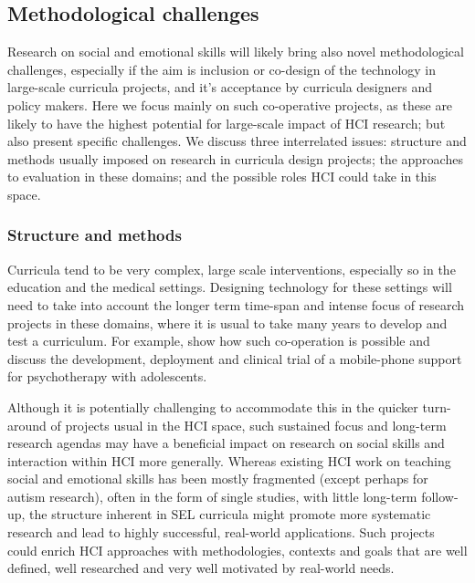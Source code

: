 \documentclass[prodmode,acmtochi]{acmsmall}
\begin{document}
\subsection{Methodological challenges}
Research on social and emotional skills will likely bring also novel methodological challenges, especially if the aim is inclusion or co-design of the technology in large-scale curricula projects, and it's acceptance by curricula designers and policy makers. Here we focus mainly on such co-operative projects, as these are likely to have the highest potential for large-scale impact of HCI research; but also present specific challenges. We discuss three interrelated issues: structure and methods usually imposed on research in curricula design projects; the approaches to evaluation in these domains; and the possible roles HCI could take in this space. 

\subsubsection{Structure and methods}
Curricula tend to be very complex, large scale interventions, especially so in the education and the medical settings. Designing technology for these settings will need to take into account the longer term time-span and intense focus of research projects in these domains, where it is usual to take many years to develop and test a curriculum. For example,  show how such co-operation is possible and discuss the development, deployment and clinical trial of a mobile-phone support for psychotherapy with adolescents. 

Although it is potentially challenging to accommodate this in the quicker turn-around of projects usual in the HCI space, such sustained focus and long-term research agendas may have a beneficial impact on research on social skills and interaction within HCI more generally. Whereas existing HCI work on teaching social and emotional skills has been mostly fragmented (except perhaps for autism research), often in the form of single studies, with little long-term follow-up, the structure inherent in SEL curricula might promote more systematic research and lead to highly successful, real-world applications. Such projects could enrich HCI approaches with methodologies, contexts and goals that are well defined, well researched and very well motivated by real-world needs. 
\end{document}
